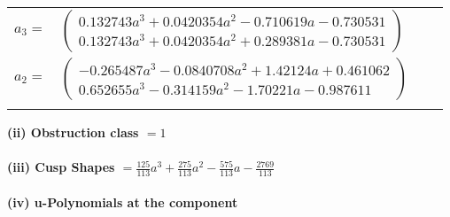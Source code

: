 \documentclass[1p]{elsarticle_modified}
\theoremstyle{definition}
\begin{document}
\begin{tabular}{m{7pt} m{180pt} m{7pt} m{180pt} }
\flushright $a_{3}=$&$\begin{pmatrix}0.132743 a^{3}+0.0420354 a^{2}-0.710619 a-0.730531\\0.132743 a^{3}+0.0420354 a^{2}+0.289381 a-0.730531\end{pmatrix}$ \\
\flushright $a_{2}=$&$\begin{pmatrix}-0.265487 a^{3}-0.0840708 a^{2}+1.42124 a+0.461062\\0.652655 a^{3}-0.314159 a^{2}-1.70221 a-0.987611\end{pmatrix}$\\&\end{tabular}
\flushleft \textbf{(ii) Obstruction class $= 1$}\\~\\
\flushleft \textbf{(iii) Cusp Shapes $= \frac{125}{113} a^3+\frac{275}{113} a^2-\frac{575}{113} a-\frac{2769}{113}$}\\~\\
\newpage\renewcommand{\arraystretch}{1}
\flushleft \textbf{(iv) u-Polynomials at the component}\newline \\
\end{document}
